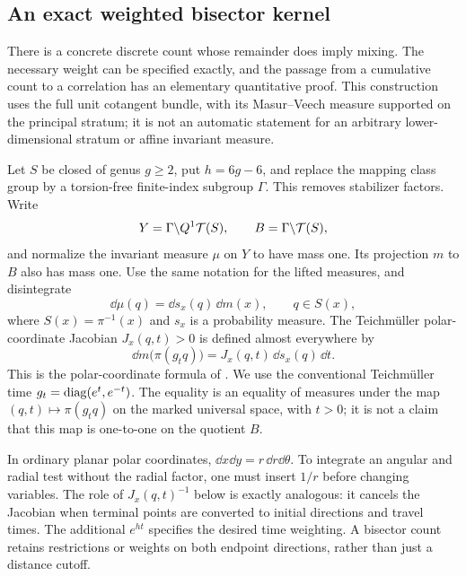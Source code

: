 \subsection{An exact weighted bisector kernel}
\label{subsec:twopointkernel}

There is a concrete discrete count whose remainder does imply mixing.
The necessary weight can be specified exactly, and the passage from a
cumulative count to a correlation has an elementary quantitative proof.
This construction uses the full unit cotangent bundle, with its
Masur--Veech measure supported on the principal stratum; it is not an
automatic statement for an arbitrary lower-dimensional stratum or
affine invariant measure.

Let $S$ be closed of genus $g\geq2$, put $h=6g-6$, and replace the
mapping class group by a torsion-free finite-index subgroup $\Gamma$.
This removes stabilizer factors. Write
\[
 Y=\Gamma\backslash Q^1\mathcal T(S),\qquad
 B=\Gamma\backslash\mathcal T(S),
\]
and normalize the invariant measure $\mu$ on $Y$ to have mass one.
Its projection $m$ to $B$ also has mass one. Use the same notation for
the lifted measures, and disintegrate
\[
 \dd\mu(q)=\dd s_x(q)\,\dd m(x),\qquad q\in S(x),
\]
where $S(x)=\pi^{-1}(x)$ and $s_x$ is a probability measure. The
Teichm\"uller polar-coordinate Jacobian $J_x(q,t)>0$ is defined almost
everywhere by
\begin{equation}
 \dd m\bigl(\pi(g_tq)\bigr)
   =J_x(q,t)\,\dd s_x(q)\,\dd t.
 \label{eq:twopointpolar}
\end{equation}
This is the polar-coordinate formula of
\cite[Section 2.4, equation (2.3)]{ABEMPolar}. We use the conventional
Teichm\"uller time $g_t=\operatorname{diag}(e^t,e^{-t})$.
The equality is an equality of measures under the map
$(q,t)\mapsto\pi(g_tq)$ on the marked universal space, with $t>0$;
it is not a claim that this map is one-to-one on the quotient $B$.

In ordinary planar polar coordinates, $\dd x\dd y=r\,\dd r\dd\theta$.
To integrate an angular and radial test without the radial factor,
one must insert $1/r$ before changing variables. The role of
$J_x(q,t)^{-1}$ below is exactly analogous: it cancels the
Jacobian when terminal points are converted to initial directions
and travel times. The additional $e^{ht}$ specifies the desired
time weighting. A bisector count retains restrictions or weights
on both endpoint directions, rather than just a distance cutoff.

